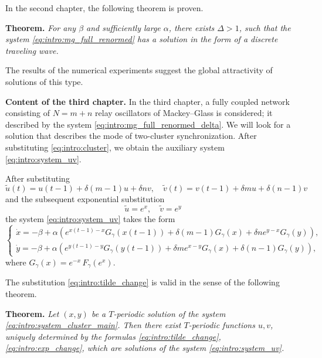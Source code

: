 In the second chapter, the following theorem is proven.

\textbf{Theorem.} \textit{For any \(\beta\) and sufficiently large \(\alpha\),
	there exists $\Delta > 1$, such that the system \eqref{eq:intro:mg_full_renormed} has a solution in the form of a discrete traveling wave.}

The results of the numerical experiments suggest the global attractivity of solutions of this type.

\bigskip

\textbf{Content of the third chapter.} In the third chapter, a fully coupled network consisting of $N = m + n$ relay oscillators of Mackey--Glass is considered; it described by the system \eqref{eq:intro:mg_full_renormed_delta}. We will look for a solution that describes the mode of two-cluster synchronization. After substituting \eqref{eq:intro:cluster}, we obtain the auxiliary system \eqref{eq:intro:system_uv}.

After substituting
\begin{equation}
	\label{eq:intro:tilde_change}
	\tilde{u}(t) = u(t - 1) + \delta (m - 1) u + \delta n v, \quad \tilde{v}(t) = v(t - 1) + \delta m u + \delta (n - 1) v
\end{equation}
%
and the subsequent exponential substitution
\begin{equation}
	\label{eq:intro:exp_change}
	\tilde{u} = e^x, \quad \tilde{v} = e^y
\end{equation}
%
the system \eqref{eq:intro:system_uv} takes the form
%
\begin{equation}
	\label{eq:intro:system_cluster_main}
	\begin{cases}
		\dot{x} = -\beta + \alpha \left(e^{x(t - 1) - x} G_{\gamma} (x(t - 1)) + \delta (m - 1) G_{\gamma} (x) + \delta n e^{y - x} G_{\gamma} (y)\right),\\
		\dot{y} = -\beta + \alpha \left(e^{y(t - 1) - y} G_{\gamma} (y(t - 1)) + \delta m e^{x - y} G_{\gamma} (x) + \delta (n - 1) G_{\gamma} (y)\right),
	\end{cases}
\end{equation}
where $G_{\gamma} (x) = e^{-x} \, F_{\gamma} (e^x)$.

The substitution \eqref{eq:intro:tilde_change} is valid in the sense of the following theorem.

\textbf{Theorem.} \textit{Let $(x, y)$ be a $T$-periodic solution of the system \eqref{eq:intro:system_cluster_main}. Then there exist $T$-periodic functions $u, v$, uniquely determined by the formulas \eqref{eq:intro:tilde_change}, \eqref{eq:intro:exp_change}, which are solutions of the system \eqref{eq:intro:system_uv}.}

